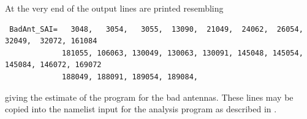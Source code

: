At the very end of the output lines are printed resembling
\begin{linenumbers}
\tiny
\resetlinenumber
\begin{verbatim}
 BadAnt_SAI=   3048,   3054,   3055,  13090,  21049,  24062,  26054,  32049,  32072, 161084
             181055, 106063, 130049, 130063, 130091, 145048, 145054, 145084, 146072, 169072
             188049, 188091, 189054, 189084,
\end{verbatim}
\end{linenumbers}
giving the estimate of the program for the bad antennas. These lines may be copied into the namelist input for the analysis program as described in . 